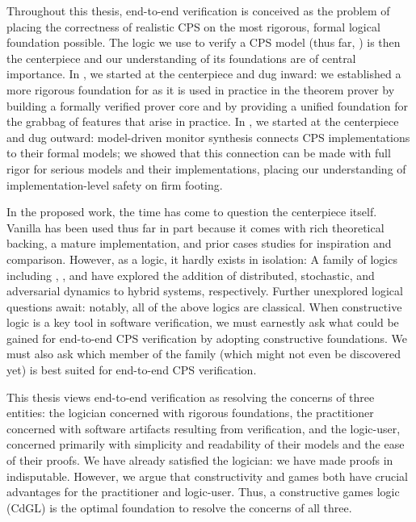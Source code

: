 \documentclass[12pt]{cmuthesis}
\theoremstyle{definition}
\theoremstyle{remark}
\newcommand{\rref}[2][]{\prettyref{#2}}
\newcommand{\CdGL}{\textsf{CdGL}\xspace}
\begin{document}
Throughout this thesis, end-to-end verification is conceived as the problem of placing the correctness of realistic CPS on the most rigorous, formal logical foundation possible.
The logic we use to verify a CPS model (thus far, \dL) is then the centerpiece and our understanding of its foundations are of central importance.
In \rref{ch:logical-foundations}, we started at the centerpiece and dug inward: we established a more rigorous foundation for \dL as it is used in practice in the theorem prover by building a formally verified prover core and by providing a unified foundation for the grabbag of features that arise in practice.
In \rref{ch:end-to-end-v}, we started at the centerpiece and dug outward: model-driven monitor synthesis connects CPS implementations to their formal models;
we showed that this connection can be made with full rigor for serious models and their implementations, placing our understanding of implementation-level safety on firm footing.

In the proposed work, the time has come to question the centerpiece itself.
Vanilla \dL has been used thus far in part because it comes with rich theoretical backing, a mature implementation, and prior cases studies for inspiration and comparison.
However, as a logic, it hardly exists in isolation: A family of logics including \QdL, \SdL, and \dGL have explored the addition of distributed, stochastic, and adversarial dynamics to hybrid systems, respectively.
Further unexplored logical questions await: notably, all of the above logics are classical.
When constructive logic is a key tool in software verification, we must earnestly ask what could be gained for end-to-end CPS verification by adopting constructive foundations.
We must also ask which member of the \dL family (which might not even be discovered yet) is best suited for end-to-end CPS verification.

This thesis views end-to-end verification as resolving the concerns of three entities:
the logician concerned with rigorous foundations, the practitioner concerned with software artifacts resulting from verification, and the logic-user, concerned primarily with simplicity and readability of their models and the ease of their proofs.
We have already satisfied the logician: we have made \dL proofs in \KeYmaeraX indisputable.
However, we argue that constructivity and games both have crucial advantages for the practitioner and logic-user.
Thus, a constructive games logic (\CdGL) is the optimal foundation to resolve the concerns of all three.
\end{document}
